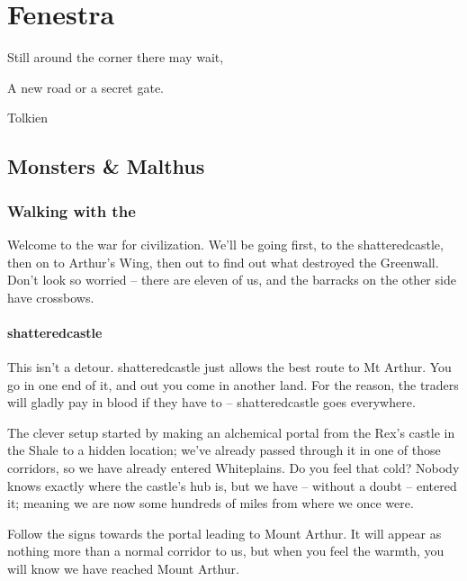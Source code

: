 \chapter{Fenestra}

\epigraph{Still around the corner there may wait,

A new road or a secret gate.}{Tolkien}

\section{Monsters \& Malthus}

\begin{multicols}{2}

\subsection{Walking with the }

\begin{exampletext}

	Welcome to the war for civilization.
	We'll be going first, to the \gls{shatteredcastle}, then on to Arthur's Wing, then out to find out what destroyed the Greenwall.
	Don't look so worried -- there are eleven of us, and the barracks on the other side have crossbows.

\end{exampletext}

\subsubsection{\Gls{shatteredcastle}}

\begin{exampletext}

	This isn't a detour.
	\Gls{shatteredcastle} just allows the best route to Mt Arthur.
	You go in one end of it, and out you come in another land.
	For the reason, the traders will gladly pay in blood if they have to -- \gls{shatteredcastle} goes everywhere.

	The clever setup started by making an alchemical portal from the Rex's castle in the Shale to a hidden location; we've already passed through it in one of those corridors, so we have already entered Whiteplains.
	Do you feel that cold?
	Nobody knows exactly where the castle's hub is, but we have -- without a doubt -- entered it; meaning we are now some hundreds of miles from where we once were.

	Follow the signs towards the portal leading to Mount Arthur.
	It will appear as nothing more than a normal corridor to us, but when you feel the warmth, you will know we have reached Mount Arthur.


\end{exampletext}
\end{multicols}
